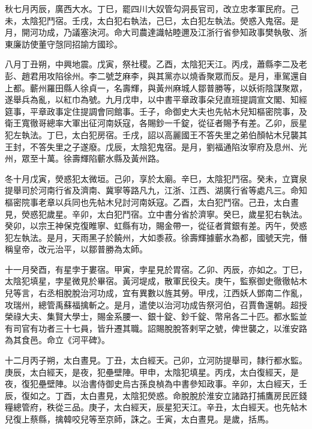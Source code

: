 \begin{pinyinscope}
 秋七月丙辰，廣西大水。丁巳，罷四川大奴管勾洞長官司，改立忠孝軍民府。己未，太陰犯鬥宿。壬戌，太白犯右執法，己巳，太白犯左執法。熒惑入鬼宿。是月，開河功成，乃議塞決河。命大司農達識帖睦邇及江浙行省參知政事樊執敬、浙東廉訪使董守愨同招諭方國珍。



 八月丁丑朔，中興地震。戊寅，祭社稷。乙酉，太陰犯天江。丙戌，蕭縣李二及老彭、趙君用攻陷徐州。李二號芝麻李，與其黨亦以燒香聚眾而反。是月，車駕還自上都。蘄州羅田縣人徐貞一，名壽輝，與黃州麻城人鄒普勝等，以妖術陰謀聚眾，遂舉兵為亂，以紅巾為號。九月戊申，以中書平章政事朵兒直班提調宣文閣、知經筵事，平章政事定住提調會同館事。壬子，命御史大夫也先帖木兒知樞密院事，及衛王寬徹哥總率大軍出征河南妖寇，各賜鈔一千錠，從征者賜予有差。乙卯，辰星犯左執法。丁巳，太白犯房宿。壬戌，詔以高麗國王不答失里之弟伯顏帖木兒襲其王封，不答失里之子遂廢。戊辰，太陰犯鬼宿。是月，劉福通陷汝寧府及息州、光州，眾至十萬。徐壽輝陷蘄水縣及黃州路。



 冬十月戊寅，熒惑犯太微垣。己卯，享於太廟。辛巳，太陰犯鬥宿。癸未，立寶泉提舉司於河南行省及濟南、冀寧等路凡九，江浙、江西、湖廣行省等處凡三。命知樞密院事老章以兵同也先帖木兒討河南妖寇。乙酉，太白犯鬥宿。己丑，太白晝見，熒惑犯歲星。辛卯，太白犯鬥宿。立中書分省於濟寧。癸巳，歲星犯右執法。癸卯，以宗王神保克復睢寧、虹縣有功，賜金帶一，從征者賞銀有差。丙午，熒惑犯左執法。是月，天雨黑子於饒州，大如黍菽。徐壽輝據蘄水為都，國號天完，僭稱皇帝，改元治平，以鄒普勝為太師。



 十一月癸酉，有星孛于婁宿。甲寅，孛星見於胃宿。乙卯、丙辰，亦如之。丁巳，太陰犯填星，孛星微見於畢宿。黃河堤成，散軍民役夫。庚午，監察御史徹徹帖木兒等言，右丞相脫脫治河功成，宜有異數以旌其勞。甲戌，江西妖人鄧南二作亂，攻瑞州，總管禹蘇福擒斬之。是月，遣使以治河功成告祭河伯，召賈魯還朝。超授榮祿大夫、集賢大學士，賜金系腰一、銀十錠、鈔千錠、幣帛各二十匹。都水監並有司官有功者三十七員，皆升遷其職。詔賜脫脫答剌罕之號，俾世襲之，以淮安路為其食邑。命立《河平碑》。



 十二月丙子朔，太白晝見。丁丑，太白經天。己卯，立河防提舉司，隸行都水監。庚辰，太白經天，是夜，犯壘壁陣。甲申，太陰犯填星。丙戌，太白復經天，是夜，復犯壘壁陣。以治書侍御史烏古孫良楨為中書參知政事。辛卯，太白經天，壬辰，復如之。丁酉，太白晝見，太陰犯熒惑。命脫脫於淮安立諸路打捕鷹房民匠錢糧總管府，秩從三品。庚子，太白經天，辰星犯天江。辛丑，太白經天。也先帖木兒復上蔡縣，擒韓咬兒等至京師，誅之。壬寅，太白晝見。是歲，括馬。




\end{pinyinscope}
